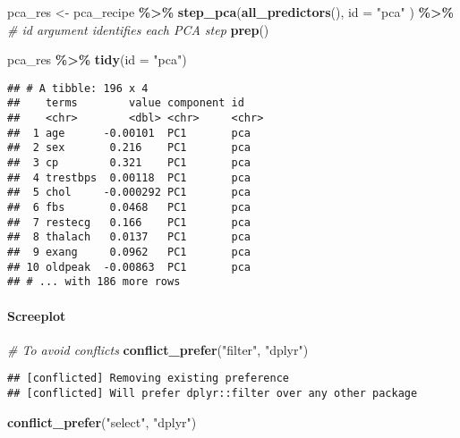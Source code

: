 \documentclass[
]{book}
\newenvironment{Shaded}{\begin{snugshade}}{\end{snugshade}}
\newcommand{\CommentTok}[1]{\textcolor[rgb]{0.56,0.35,0.01}{\textit{#1}}}
\newcommand{\DataTypeTok}[1]{\textcolor[rgb]{0.13,0.29,0.53}{#1}}
\newcommand{\KeywordTok}[1]{\textcolor[rgb]{0.13,0.29,0.53}{\textbf{#1}}}
\newcommand{\NormalTok}[1]{#1}
\newcommand{\OperatorTok}[1]{\textcolor[rgb]{0.81,0.36,0.00}{\textbf{#1}}}
\newcommand{\StringTok}[1]{\textcolor[rgb]{0.31,0.60,0.02}{#1}}
\begin{document}
\begin{Shaded}
\begin{Highlighting}[]
\NormalTok{pca\_res \textless{}{-}}\StringTok{ }\NormalTok{pca\_recipe }\OperatorTok{\%\textgreater{}\%}
\StringTok{  }\KeywordTok{step\_pca}\NormalTok{(}\KeywordTok{all\_predictors}\NormalTok{(),}
    \DataTypeTok{id =} \StringTok{"pca"}
\NormalTok{  ) }\OperatorTok{\%\textgreater{}\%}\StringTok{ }\CommentTok{\# id argument identifies each PCA step}
\StringTok{  }\KeywordTok{prep}\NormalTok{()}

\NormalTok{pca\_res }\OperatorTok{\%\textgreater{}\%}
\StringTok{  }\KeywordTok{tidy}\NormalTok{(}\DataTypeTok{id =} \StringTok{"pca"}\NormalTok{)}
\end{Highlighting}
\end{Shaded}

\begin{verbatim}
## # A tibble: 196 x 4
##    terms        value component id   
##    <chr>        <dbl> <chr>     <chr>
##  1 age      -0.00101  PC1       pca  
##  2 sex       0.216    PC1       pca  
##  3 cp        0.321    PC1       pca  
##  4 trestbps  0.00118  PC1       pca  
##  5 chol     -0.000292 PC1       pca  
##  6 fbs       0.0468   PC1       pca  
##  7 restecg   0.166    PC1       pca  
##  8 thalach   0.0137   PC1       pca  
##  9 exang     0.0962   PC1       pca  
## 10 oldpeak  -0.00863  PC1       pca  
## # ... with 186 more rows
\end{verbatim}

\hypertarget{screeplot}{%
\paragraph{Screeplot}\label{screeplot}}

\begin{Shaded}
\begin{Highlighting}[]
\CommentTok{\# To avoid conflicts}
\KeywordTok{conflict\_prefer}\NormalTok{(}\StringTok{"filter"}\NormalTok{, }\StringTok{"dplyr"}\NormalTok{)}
\end{Highlighting}
\end{Shaded}

\begin{verbatim}
## [conflicted] Removing existing preference
## [conflicted] Will prefer dplyr::filter over any other package
\end{verbatim}

\begin{Shaded}
\begin{Highlighting}[]
\KeywordTok{conflict\_prefer}\NormalTok{(}\StringTok{"select"}\NormalTok{, }\StringTok{"dplyr"}\NormalTok{)}
\end{Highlighting}
\end{Shaded}
\end{document}
